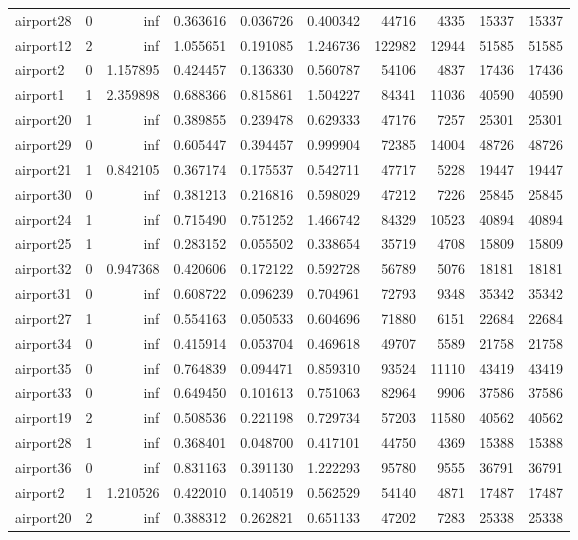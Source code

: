 \begin{longtable}{|l|r|r|r|r|r|r|r|r|r|}
airport28 & 0 & inf & 0.363616 & 0.036726 & 0.400342 & 44716 & 4335 & 15337 & 15337 \\
airport12 & 2 & inf & 1.055651 & 0.191085 & 1.246736 & 122982 & 12944 & 51585 & 51585 \\
airport2 & 0 & 1.157895 & 0.424457 & 0.136330 & 0.560787 & 54106 & 4837 & 17436 & 17436 \\
airport1 & 1 & 2.359898 & 0.688366 & 0.815861 & 1.504227 & 84341 & 11036 & 40590 & 40590 \\
airport20 & 1 & inf & 0.389855 & 0.239478 & 0.629333 & 47176 & 7257 & 25301 & 25301 \\
airport29 & 0 & inf & 0.605447 & 0.394457 & 0.999904 & 72385 & 14004 & 48726 & 48726 \\
airport21 & 1 & 0.842105 & 0.367174 & 0.175537 & 0.542711 & 47717 & 5228 & 19447 & 19447 \\
airport30 & 0 & inf & 0.381213 & 0.216816 & 0.598029 & 47212 & 7226 & 25845 & 25845 \\
airport24 & 1 & inf & 0.715490 & 0.751252 & 1.466742 & 84329 & 10523 & 40894 & 40894 \\
airport25 & 1 & inf & 0.283152 & 0.055502 & 0.338654 & 35719 & 4708 & 15809 & 15809 \\
airport32 & 0 & 0.947368 & 0.420606 & 0.172122 & 0.592728 & 56789 & 5076 & 18181 & 18181 \\
airport31 & 0 & inf & 0.608722 & 0.096239 & 0.704961 & 72793 & 9348 & 35342 & 35342 \\
airport27 & 1 & inf & 0.554163 & 0.050533 & 0.604696 & 71880 & 6151 & 22684 & 22684 \\
airport34 & 0 & inf & 0.415914 & 0.053704 & 0.469618 & 49707 & 5589 & 21758 & 21758 \\
airport35 & 0 & inf & 0.764839 & 0.094471 & 0.859310 & 93524 & 11110 & 43419 & 43419 \\
airport33 & 0 & inf & 0.649450 & 0.101613 & 0.751063 & 82964 & 9906 & 37586 & 37586 \\
airport19 & 2 & inf & 0.508536 & 0.221198 & 0.729734 & 57203 & 11580 & 40562 & 40562 \\
airport28 & 1 & inf & 0.368401 & 0.048700 & 0.417101 & 44750 & 4369 & 15388 & 15388 \\
airport36 & 0 & inf & 0.831163 & 0.391130 & 1.222293 & 95780 & 9555 & 36791 & 36791 \\
airport2 & 1 & 1.210526 & 0.422010 & 0.140519 & 0.562529 & 54140 & 4871 & 17487 & 17487 \\
airport20 & 2 & inf & 0.388312 & 0.262821 & 0.651133 & 47202 & 7283 & 25338 & 25338 \\

\end{longtable}
